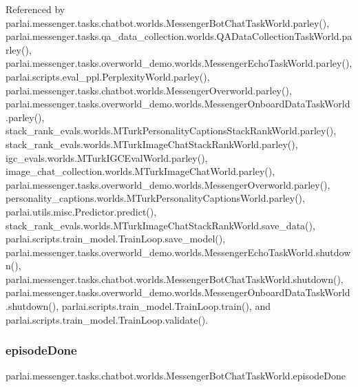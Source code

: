 Referenced by parlai.\+messenger.\+tasks.\+chatbot.\+worlds.\+Messenger\+Bot\+Chat\+Task\+World.\+parley(), parlai.\+messenger.\+tasks.\+qa\+\_\+data\+\_\+collection.\+worlds.\+Q\+A\+Data\+Collection\+Task\+World.\+parley(), parlai.\+messenger.\+tasks.\+overworld\+\_\+demo.\+worlds.\+Messenger\+Echo\+Task\+World.\+parley(), parlai.\+scripts.\+eval\+\_\+ppl.\+Perplexity\+World.\+parley(), parlai.\+messenger.\+tasks.\+chatbot.\+worlds.\+Messenger\+Overworld.\+parley(), parlai.\+messenger.\+tasks.\+overworld\+\_\+demo.\+worlds.\+Messenger\+Onboard\+Data\+Task\+World.\+parley(), stack\+\_\+rank\+\_\+evals.\+worlds.\+M\+Turk\+Personality\+Captions\+Stack\+Rank\+World.\+parley(), stack\+\_\+rank\+\_\+evals.\+worlds.\+M\+Turk\+Image\+Chat\+Stack\+Rank\+World.\+parley(), igc\+\_\+evals.\+worlds.\+M\+Turk\+I\+G\+C\+Eval\+World.\+parley(), image\+\_\+chat\+\_\+collection.\+worlds.\+M\+Turk\+Image\+Chat\+World.\+parley(), parlai.\+messenger.\+tasks.\+overworld\+\_\+demo.\+worlds.\+Messenger\+Overworld.\+parley(), personality\+\_\+captions.\+worlds.\+M\+Turk\+Personality\+Captions\+World.\+parley(), parlai.\+utils.\+misc.\+Predictor.\+predict(), stack\+\_\+rank\+\_\+evals.\+worlds.\+M\+Turk\+Image\+Chat\+Stack\+Rank\+World.\+save\+\_\+data(), parlai.\+scripts.\+train\+\_\+model.\+Train\+Loop.\+save\+\_\+model(), parlai.\+messenger.\+tasks.\+overworld\+\_\+demo.\+worlds.\+Messenger\+Echo\+Task\+World.\+shutdown(), parlai.\+messenger.\+tasks.\+chatbot.\+worlds.\+Messenger\+Bot\+Chat\+Task\+World.\+shutdown(), parlai.\+messenger.\+tasks.\+overworld\+\_\+demo.\+worlds.\+Messenger\+Onboard\+Data\+Task\+World.\+shutdown(), parlai.\+scripts.\+train\+\_\+model.\+Train\+Loop.\+train(), and parlai.\+scripts.\+train\+\_\+model.\+Train\+Loop.\+validate().

\mbox{\label{classparlai_1_1messenger_1_1tasks_1_1chatbot_1_1worlds_1_1MessengerBotChatTaskWorld_ae658c900e800e43f6eae12ceea29bf44}} 
\subsubsection{\texorpdfstring{episode\+Done}{episodeDone}}
{\footnotesize\ttfamily parlai.\+messenger.\+tasks.\+chatbot.\+worlds.\+Messenger\+Bot\+Chat\+Task\+World.\+episode\+Done}



